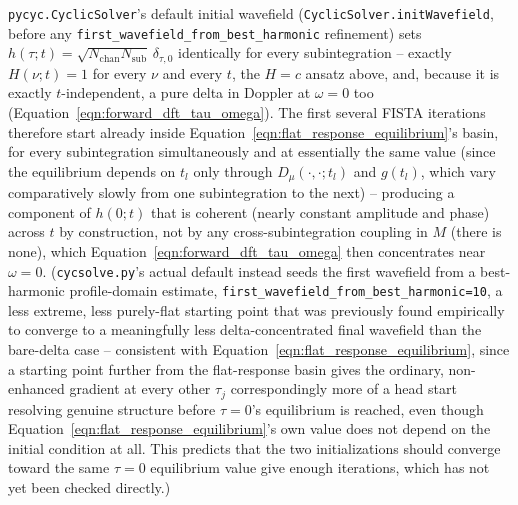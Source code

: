 \documentclass[manuscript]{aastex631}
\newcommand{\Nsub}{\ensuremath{N_\mathrm{sub}}}
\newcommand{\Nchan}{\ensuremath{N_\mathrm{chan}}}
\newcommand{\Eqn}[1]{Equation~\ref{eqn:#1}}
\begin{document}
\texttt{pycyc.CyclicSolver}'s default initial wavefield (\texttt{CyclicSolver.initWavefield}, before
any \texttt{first\_wavefield\_from\_best\_harmonic} refinement) sets
$h(\tau;t)=\sqrt{\Nchan\Nsub}\,\delta_{\tau,0}$ identically for every subintegration -- exactly
$H(\nu;t)=1$ for every $\nu$ and every $t$, the $H=c$ ansatz above, and, because it is exactly
$t$-independent, a pure delta in Doppler at $\omega=0$ too (\Eqn{forward_dft_tau_omega}). The first
several FISTA iterations therefore start already inside \Eqn{flat_response_equilibrium}'s basin,
for every subintegration simultaneously and at essentially the same value (since the equilibrium
depends on $t_l$ only through $D_\mu(\cdot,\cdot;t_l)$ and $g(t_l)$, which vary comparatively slowly
from one subintegration to the next) -- producing a component of $h(0;t)$ that is coherent (nearly
constant amplitude and phase) across $t$ by construction, not by any cross-subintegration coupling
in $M$ (there is none), which \Eqn{forward_dft_tau_omega} then concentrates near $\omega=0$.
(\texttt{cycsolve.py}'s actual default instead seeds the first wavefield from a best-harmonic
profile-domain estimate, \texttt{first\_wavefield\_from\_best\_harmonic=10}, a less extreme, less
purely-flat starting point that was previously found empirically to converge to a meaningfully
less delta-concentrated final wavefield than the bare-delta case -- consistent with
\Eqn{flat_response_equilibrium}, since a starting point further from the flat-response basin gives
the ordinary, non-enhanced gradient at every other $\tau_j$ correspondingly more of a head start
resolving genuine structure before $\tau=0$'s equilibrium is reached, even though
\Eqn{flat_response_equilibrium}'s own value does not depend on the initial condition at all. This
predicts that the two initializations should converge toward the same $\tau=0$ equilibrium value
give enough iterations, which has not yet been checked directly.)
\end{document}
